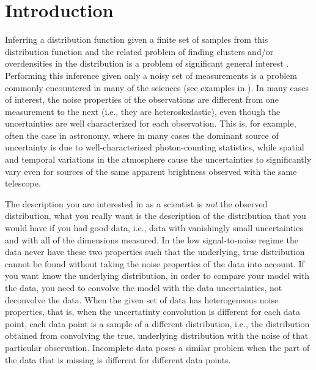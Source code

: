 \documentclass[aoas,preprint,authoryear,round]{imsart}
\newcommand{\eg}{e.g.}
\newcommand{\ie}{i.e.}
\begin{document}
\begin{frontmatter}
\begin{keyword}[class=AMS]
\end{keyword}

\begin{keyword}
\end{keyword}

\end{frontmatter}



\section{Introduction}


Inferring a distribution function given a finite set of samples from
this distribution function and the related problem of finding clusters
and/or overdensities in the distribution is a problem of significant
general interest
\citep[\eg,][]{McLachlan1988,Rabiner1993,1998AJ....115.2384D,1999Natur.402...53H,1999MNRAS.308..731S,2005ApJ...629..268H}.
Performing this inference given only a noisy set of measurements is a
problem commonly encountered in many of the sciences (see examples in
\citealt{Carroll06a}). In many cases of interest, the noise
properties of the observations are different from one measurement to
the next (\ie, they are heteroskedastic), even though the
uncertainties are well characterized for each observation. This is,
for example, often the case in astronomy, where in many cases the
dominant source of uncertainty is due to well-characterized
photon-counting statistics, while spatial and temporal variations in
the atmosphere cause the uncertainties to significantly vary even for
sources of the same apparent brightness observed with the same
telescope.


The description you are interested in as a scientist is \emph{not} the
observed distribution, what you really want is the description of the
distribution that you would have if you had good data, \ie, data with
vanishingly small uncertainties and with all of the dimensions
measured. In the low signal-to-noise regime the data never have these
two properties such that the underlying, true distribution cannot be
found without taking the noise properties of the data into account. If
you want know the underlying distribution, in order to compare your
model with the data, you need to convolve the model with the data
uncertainties, not deconvolve the data. When the given set of data has
heterogeneous noise properties, that is, when the uncertatinty
convolution is different for each data point, each data point is a
sample of a different distribution, \ie, the distribution obtained
from convolving the true, underlying distribution with the noise of
that particular observation. Incomplete data poses a similar problem
when the part of the data that is missing is different for different
data points. 
\end{document}
